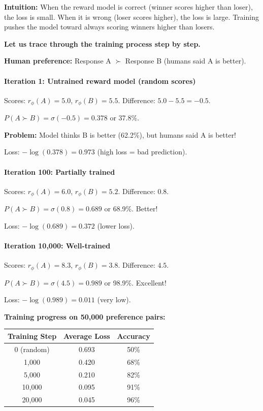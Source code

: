 \begin{chapterenv}
\begin{infobox}
\textbf{Intuition:} When the reward model is correct (winner scores higher than loser), the loss is small. When it is wrong (loser scores higher), the loss is large. Training pushes the model toward always scoring winners higher than losers.
\end{infobox}

\textbf{Let us trace through the training process step by step.}

\textbf{Human preference:} Response A $\succ$ Response B (humans said A is better).

\paragraph{Iteration 1: Untrained reward model (random scores)}

Scores: $r_\phi(A) = 5.0$, $r_\phi(B) = 5.5$. Difference: $5.0 - 5.5 = -0.5$.

$P(A \succ B) = \sigma(-0.5) = 0.378$ or 37.8\%.

\textbf{Problem:} Model thinks B is better (62.2\%), but humans said A is better!

Loss: $-\log(0.378) = 0.973$ (high loss = bad prediction).

\paragraph{Iteration 100: Partially trained}

Scores: $r_\phi(A) = 6.0$, $r_\phi(B) = 5.2$. Difference: $0.8$.

$P(A \succ B) = \sigma(0.8) = 0.689$ or 68.9\%. Better!

Loss: $-\log(0.689) = 0.372$ (lower loss).

\paragraph{Iteration 10,000: Well-trained}

Scores: $r_\phi(A) = 8.3$, $r_\phi(B) = 3.8$. Difference: $4.5$.

$P(A \succ B) = \sigma(4.5) = 0.989$ or 98.9\%. Excellent!

Loss: $-\log(0.989) = 0.011$ (very low).

\textbf{Training progress on 50,000 preference pairs:}

\begin{center}
\begin{tabular}{ccc}
\toprule
\textbf{Training Step} & \textbf{Average Loss} & \textbf{Accuracy} \\
\midrule
0 (random) & 0.693 & 50\% \\
1,000 & 0.420 & 68\% \\
5,000 & 0.210 & 82\% \\
10,000 & 0.095 & 91\% \\
20,000 & 0.045 & 96\% \\
\bottomrule
\end{tabular}
\end{center}


\end{chapterenv}
